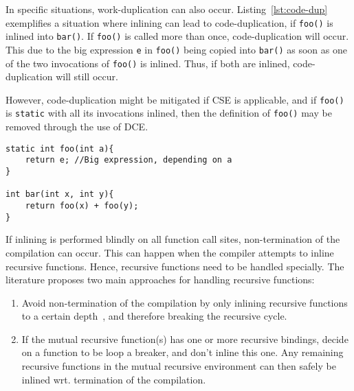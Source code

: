 In specific situations, work-duplication can also occur\cite{GHCPaper}.
Listing~\ref{lst:code-dup} exemplifies a situation where inlining can lead to
code-duplication, if \lstinline!foo()! is inlined into \lstinline!bar()!. If
\lstinline!foo()! is called more than once, code-duplication will occur. This
due to the big expression \lstinline!e! in \lstinline!foo()! being copied
into \lstinline!bar()! as soon as one of the two invocations of
\lstinline!foo()! is inlined. Thus, if both are inlined, code-duplication will
still occur.

However, code-duplication might be mitigated if CSE is applicable, and if
\lstinline!foo()! is \lstinline!static! with all its invocations inlined, then
the definition of \lstinline!foo()! may be removed through the use of DCE.

\begin{centering}
	\noindent\begin{minipage}{\textwidth}
		\begin{CenteredBox}
		\begin{lstlisting}[style=global_customcpp]
static int foo(int a){
	return e; //Big expression, depending on a
}

int bar(int x, int y){
	return foo(x) + foo(y);
}
		\end{lstlisting}
		\end{CenteredBox}
	\end{minipage}
	\label{lst:code-dup}
\end{centering}

If inlining is performed blindly on all function call sites, non-termination of
the compilation can occur. This can happen when the compiler attempts to inline
recursive functions. Hence, recursive functions need to be handled specially.
The literature proposes two main approaches for handling recursive functions:

\begin{enumerate}

	\item Avoid non-termination of the compilation by only inlining recursive
functions to a certain depth~\cite{GHCPaper}\cite{InlineWhenHowSerrano}, and
therefore breaking the recursive cycle.

	\item If the mutual recursive function(s) has one or more recursive
bindings, decide on a function to be loop a breaker, and don't inline this one.
Any remaining recursive functions in the mutual recursive environment can then
safely be inlined wrt. termination of the
compilation\cite{BasMscThesis}\cite{GHCPaper}.

\end{enumerate}

